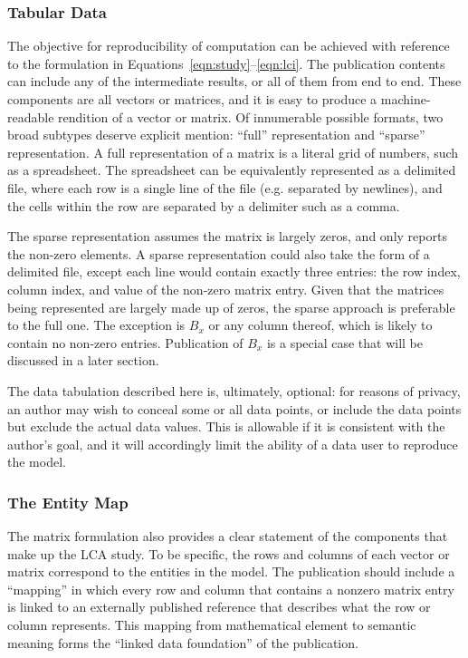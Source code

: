 
\subsubsection{Tabular Data}

The objective for reproducibility of computation can be achieved with reference to the formulation in Equations~\ref{eqn:study}--\ref{eqn:lci}.  The publication contents can include any of the intermediate results, or all of them from end to end.  These components are all vectors or matrices, and it is easy to produce a machine-readable rendition of a vector or matrix.  Of innumerable possible formats, two broad subtypes deserve explicit mention: ``full'' representation and ``sparse'' representation.  A full representation of a matrix is a literal grid of numbers, such as a spreadsheet.  The spreadsheet can be equivalently represented as a delimited file, where each row is a single line of the file (e.g. separated by newlines), and the cells within the row are separated by a delimiter such as a comma.

The sparse representation assumes the matrix is largely zeros, and only reports the non-zero elements.  A sparse representation could also take the form of a delimited file, except each line would contain exactly three entries: the row index, column index, and value of the non-zero matrix entry.  Given that the matrices being represented are largely made up of zeros, the sparse approach is preferable to the full one.  The exception is $B_x$ or any column thereof, which is likely to contain no non-zero entries.  Publication of $B_x$ is a special case that will be discussed in a later section.

The data tabulation described here is, ultimately, optional: for reasons of privacy, an author may wish to conceal some or all data points, or include the data points but exclude the actual data values.  This is allowable if it is consistent with the author's goal, and it will accordingly limit the ability of a data user to reproduce the model. 

\subsubsection{The Entity Map}


The matrix formulation also provides a clear statement of the components that make up the LCA study.  To be specific, the rows and columns of each vector or matrix correspond to the entities in the model.  The publication should include a ``mapping'' in which every row and column that contains a nonzero matrix entry is linked to an externally published reference that describes what the row or column represents.  This mapping from mathematical element to semantic meaning forms the ``linked data foundation'' of the publication.

